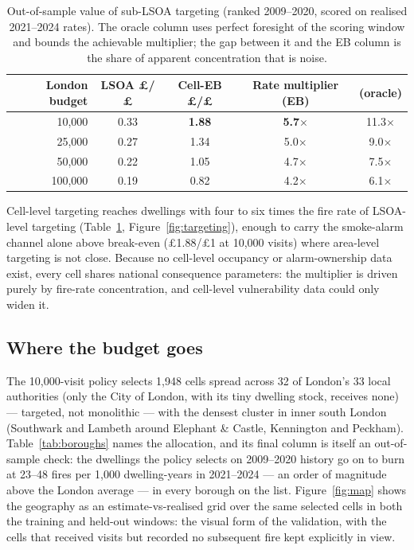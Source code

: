 \documentclass[11pt]{article}
\begin{document}
\begin{table}[htbp]
  \centering
  \caption{Out-of-sample value of sub-LSOA targeting (ranked 2009--2020,
  scored on realised 2021--2024 rates). The oracle column uses perfect
  foresight of the scoring window and bounds the achievable multiplier; the gap
  between it and the EB column is the share of apparent concentration that is
  noise.}
  \label{tab:cellvalue}
  \small
  \begin{tabular}{@{}rcccc@{}}
    \toprule
    London budget & LSOA \pounds/\pounds & Cell-EB \pounds/\pounds &
    Rate multiplier (EB) & (oracle) \\
    \midrule
    10{,}000  & 0.33 & \textbf{1.88} & \textbf{5.7$\times$} & 11.3$\times$ \\
    25{,}000  & 0.27 & 1.34 & 5.0$\times$ & 9.0$\times$ \\
    50{,}000  & 0.22 & 1.05 & 4.7$\times$ & 7.5$\times$ \\
    100{,}000 & 0.19 & 0.82 & 4.2$\times$ & 6.1$\times$ \\
    \bottomrule
  \end{tabular}
\end{table}

Cell-level targeting reaches dwellings with four to six times the fire rate of
LSOA-level targeting (Table~\ref{tab:cellvalue}, Figure~\ref{fig:targeting}),
enough to carry the smoke-alarm channel alone above break-even
(\pounds1.88/\pounds1 at 10{,}000 visits) where area-level targeting is not
close. Because no cell-level occupancy or alarm-ownership data exist, every
cell shares national consequence parameters: the multiplier is driven purely by
fire-rate concentration, and cell-level vulnerability data could only widen it.

\subsection{Where the budget goes}

The 10{,}000-visit policy selects 1{,}948 cells spread across 32 of London's 33 local authorities (only
the City of London, with its tiny dwelling stock, receives none) --- targeted,
not monolithic --- with the densest cluster in inner
south London (Southwark and Lambeth around Elephant \& Castle, Kennington and
Peckham). Table~\ref{tab:boroughs} names the allocation, and its final column
is itself an out-of-sample check: the dwellings the policy selects on
2009--2020 history go on to burn at 23--48 fires per 1{,}000 dwelling-years in
2021--2024 --- an order of magnitude above the London average --- in every
borough on the list. Figure~\ref{fig:map} shows the geography as an
estimate-vs-realised grid over the same selected cells in both the training
and held-out windows: the visual form of the validation, with the cells that
received visits but recorded no subsequent fire kept explicitly in view.
\end{document}
